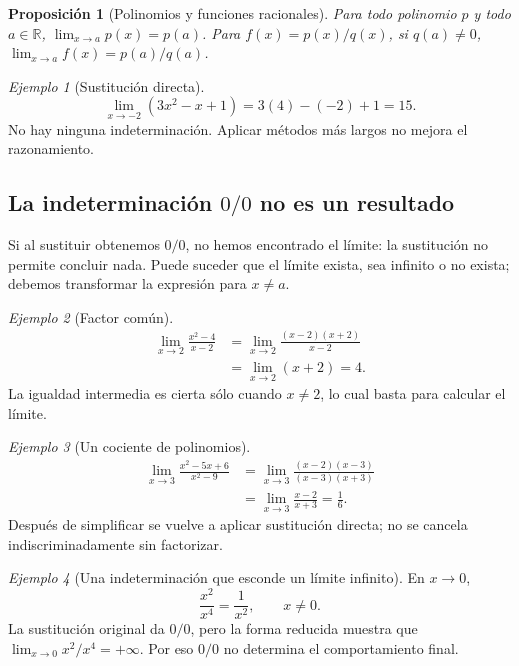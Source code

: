 \documentclass[12pt]{article}
\newtheorem{proposicion}[definicion]{Proposición}
\theoremstyle{remark}
\newtheorem{ejemplo}{Ejemplo}
\newcommand{\R}{\mathbb{R}}
\begin{document}
\begin{proposicion}[Polinomios y funciones racionales]
Para todo polinomio $p$ y todo $a\in\R$, $\lim_{x\to a}p(x)=p(a)$. Para $f(x)=p(x)/q(x)$, si $q(a)\ne0$, $\lim_{x\to a}f(x)=p(a)/q(a)$.
\end{proposicion}

\begin{ejemplo}[Sustitución directa]
\[
 \lim_{x\to-2}(3x^2-x+1)=3(4)-(-2)+1=\boxed{15}.
\]
No hay ninguna indeterminación. Aplicar métodos más largos no mejora el razonamiento.
\end{ejemplo}

\subsection*{La indeterminación $0/0$ no es un resultado}
Si al sustituir obtenemos $0/0$, no hemos encontrado el límite: la sustitución no permite concluir nada. Puede suceder que el límite exista, sea infinito o no exista; debemos transformar la expresión para $x\ne a$.

\begin{ejemplo}[Factor común]
\begin{align*}
 \lim_{x\to2}\frac{x^2-4}{x-2}
 &=\lim_{x\to2}\frac{(x-2)(x+2)}{x-2}\\
 &=\lim_{x\to2}(x+2)=\boxed{4}.
\end{align*}
La igualdad intermedia es cierta sólo cuando $x\ne2$, lo cual basta para calcular el límite.
\end{ejemplo}

\begin{ejemplo}[Un cociente de polinomios]
\begin{align*}
\lim_{x\to3}\frac{x^2-5x+6}{x^2-9}
 &=\lim_{x\to3}\frac{(x-2)(x-3)}{(x-3)(x+3)}\\
 &=\lim_{x\to3}\frac{x-2}{x+3}=\boxed{\frac16}.
\end{align*}
Después de simplificar se vuelve a aplicar sustitución directa; no se cancela indiscriminadamente sin factorizar.
\end{ejemplo}

\begin{ejemplo}[Una indeterminación que esconde un límite infinito]
En $x\to0$,
\[
 \frac{x^2}{x^4}=\frac1{x^2},\qquad x\ne0.
\]
La sustitución original da $0/0$, pero la forma reducida muestra que $\lim_{x\to0}x^2/x^4=+\infty$. Por eso $0/0$ no determina el comportamiento final.
\end{ejemplo}
\end{document}
